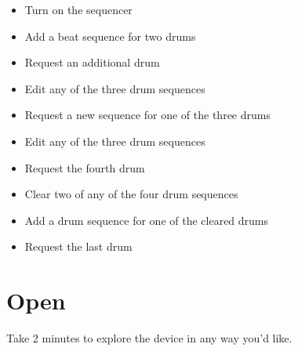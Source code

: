 \documentclass{article}
\begin{document}
\begin{itemize}
    \item Turn on the sequencer
    \item Add a beat sequence for two drums
    \item Request an additional drum
    \item Edit any of the three drum sequences
    \item Request a new sequence for one of the three drums
    \item Edit any of the three drum sequences
    \item Request the fourth drum
    \item Clear two of any of the four drum sequences
    \item Add a drum sequence for one of the cleared drums
    \item Request the last drum
\end{itemize}

\newpage

\section{Open}

Take 2 minutes to explore the device in any way you'd like. 
\end{document}
